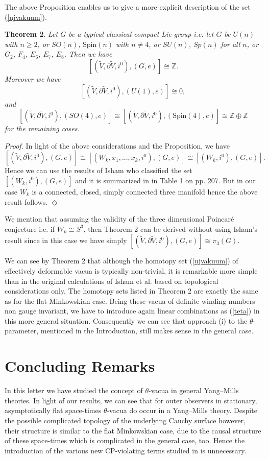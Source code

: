 \documentclass[a4paper,12pt,draft]{article}
\newcommand{\Z}{{\mathbb Z}}
\begin{document}
\noindent The above Proposition enables us to give a more explicit
description of the set (\ref{ujvakuum}).
\vspace{0.1in}

{\bf Theorem 2}. {\it Let $G$ be a typical classical compact Lie group
i.e. let $G$ be $U(n)$ with $n\geq 2$, or $SO(n)$,} Spin$(n)$ {\it with
$n\not=4$, or $SU(n)$, $Sp(n)$ for all $n$, or
$G_2$, $F_4$, $E_6$, $E_7$, $E_8$. Then we have
\[\left[ (\widetilde{V}, \partial\widetilde{V}, i^0), (G,
e)\right]\cong\Z .\]
Moreover we have  
\[\left[ (\widetilde{V}, \partial\widetilde{V}, i^0), (U(1),    
e)\right]\cong 0,\]
and}
\[\left[ (\widetilde{V}, \partial\widetilde{V}, i^0), (SO(4),
e)\right]\cong\left[ (\widetilde{V},
\partial\widetilde{V}, i^0), (\mbox{Spin}(4), e)\right]\cong
\Z\oplus\Z\]
{\it for the remaining cases.}
\vspace{0.1in}

{\it Proof.} In light of the above considerations and the Proposition, we
have 
\[[(\widetilde{V}, \partial\widetilde{V}, i^0), (G,e)]\cong [(W_k,
x_1,...,x_k, i^0), (G,e)]\cong [(W_k, i^0), (G,e)].\]
Hence we can use the results of Isham who classified the set $[(W_k,
i^0), (G,e)]$ and it is summarized in \cite{isham1} in Table 1 on pp. 207.
But in our case $W_k$ is a connected, closed, simply connected
three manifold hence the above result follows. $\Diamond$
\vspace{0.1in}

 We mention that assuming the validity of the three
dimensional Poincar\'e conjecture i.e. if $W_k\cong S^3$, then Theorem 2
can be derived without using Isham's result since in this case we have
simply $[(\widetilde{V}, \partial\widetilde{V}, i^0),
(G,e)]\cong\pi_3(G)$.

We can see by Theorem 2 that although the homotopy set
(\ref{ujvakuum}) of effectively deformable vacua is typically non-trivial,
it is remarkable more simple than in the original calculations of Isham et
al. based on topological considerations only. The homotopy sets listed in
Theorem 2 are exactly the same as for the flat Minkowskian case.
Being these vacua of definite winding numbers non gauge invariant, we have
to introduce again linear combinations as (\ref{teta}) in this more
general situation. Consequently we can see that approach (i) to the
$\theta$-parameter, mentioned in the Introduction, still makes sense in
the general case.
 
\section{Concluding Remarks}
In this letter we have studied the concept of $\theta$-vacua
in general Yang--Mills theories. In light of our results, we can see that
for outer observers in stationary, asymptotically flat space-times
$\theta$-vacua do occur in a Yang--Mills theory. Despite the possible 
complicated topology of the underlying Cauchy surface however, their
structure is similar to the flat Minkowskian case, due to the
causal structure of these space-times which is complicated in the general
case, too. Hence the introduction of the various new CP-violating terms
studied in \cite{isham5} is unnecessary.
\end{document}
